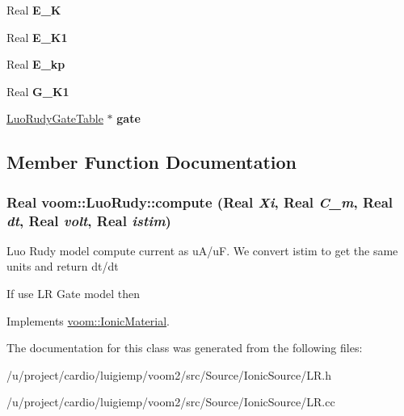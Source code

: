 \begin{DoxyCompactItemize}
\item 
\hypertarget{classvoom_1_1_luo_rudy_a1714aa5e2bab1022c1de022d8c776217}{
Real {\bfseries E\_\-K}}
\label{classvoom_1_1_luo_rudy_a1714aa5e2bab1022c1de022d8c776217}

\item 
\hypertarget{classvoom_1_1_luo_rudy_ab3d362f1f10fda458f29a163690c966e}{
Real {\bfseries E\_\-K1}}
\label{classvoom_1_1_luo_rudy_ab3d362f1f10fda458f29a163690c966e}

\item 
\hypertarget{classvoom_1_1_luo_rudy_a9886c66b06535e6363d5b02de6a0fa36}{
Real {\bfseries E\_\-kp}}
\label{classvoom_1_1_luo_rudy_a9886c66b06535e6363d5b02de6a0fa36}

\item 
\hypertarget{classvoom_1_1_luo_rudy_a2b431b18716682153eac9138badcae71}{
Real {\bfseries G\_\-K1}}
\label{classvoom_1_1_luo_rudy_a2b431b18716682153eac9138badcae71}

\item 
\hypertarget{classvoom_1_1_luo_rudy_a6bd41f999aa8deec3aa212b5850690ea}{
\hyperlink{class_luo_rudy_gate_table}{LuoRudyGateTable} $\ast$ {\bfseries gate}}
\label{classvoom_1_1_luo_rudy_a6bd41f999aa8deec3aa212b5850690ea}

\end{DoxyCompactItemize}


\subsection{Member Function Documentation}
\hypertarget{classvoom_1_1_luo_rudy_a183e2b1a92b358944679f9e07e38c4be}{
\subsubsection[{compute}]{\setlength{\rightskip}{0pt plus 5cm}Real voom::LuoRudy::compute (Real {\em Xi}, \/  Real {\em C\_\-m}, \/  Real {\em dt}, \/  Real {\em volt}, \/  Real {\em istim})}}
\label{classvoom_1_1_luo_rudy_a183e2b1a92b358944679f9e07e38c4be}
Luo Rudy model compute current as uA/uF. We convert istim to get the same units and return dt/dt 

If use LR Gate model then 

Implements \hyperlink{classvoom_1_1_ionic_material_a1b95cf90af115374b428f2e5ece571cb}{voom::IonicMaterial}.

The documentation for this class was generated from the following files:\begin{DoxyCompactItemize}
\item 
/u/project/cardio/luigiemp/voom2/src/Source/IonicSource/LR.h\item 
/u/project/cardio/luigiemp/voom2/src/Source/IonicSource/LR.cc\end{DoxyCompactItemize}
